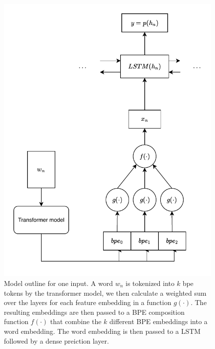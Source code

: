 \documentclass[11pt]{article}
\newcommand\jp[1]{(\textbf{JP:} #1)}
\begin{document}
	\begin{figure}%
          \centering
	\includegraphics[scale=0.5]{single_step.pdf}
    \caption{\label{fig:model} Model outline for one input. A
     word $w_n$ is tokenized into $k$ bpe tokens by the transformer
     model, we then calculate a weighted sum over the layers for each
     feature embedding in a function $g(\cdot)$. The resulting
     embeddings are then passed to a BPE composition function
     $f(\cdot)$ that combine the $k$ different BPE embeddings into a
     word embedding. The word embedding is then passed to a LSTM
     followed by a dense preiction layer. }
	\end{figure}

	
\end{document}
